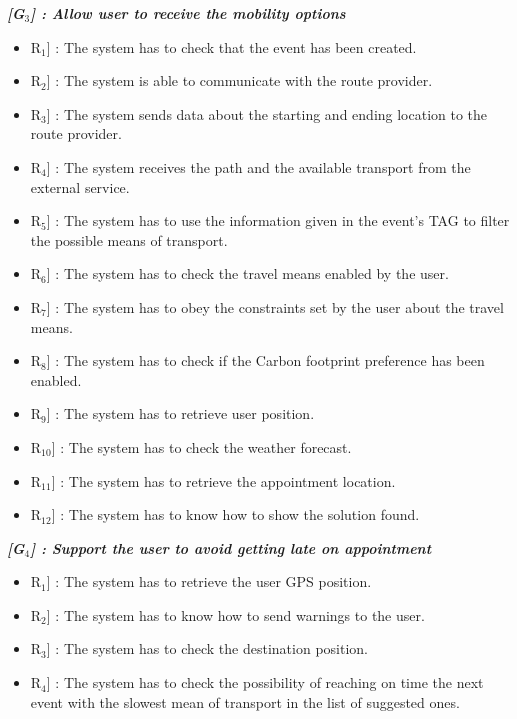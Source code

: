 \vspace{0.5cm}
\noindent
\emph{\textbf{[G$_{3}$] : Allow user to receive the mobility options}}
\begin{itemize}
	\setlength{\leftskip}{0.5cm}
	\item \lbrack R$_{1}$] : The system has to check that the event has been created.
	\item \lbrack R$_{2}$] : The system is able to communicate with the route provider.
	\item \lbrack R$_{3}$] : The system sends data about the starting and ending location to the route provider.
	\item \lbrack R$_{4}$] : The system receives the path and the available transport from the external service.
	\item \lbrack R$_{5}$] : The system has to use the information given in the event’s TAG to filter the possible means of transport.
	\item \lbrack R$_{6}$] : The system has to check the travel means enabled by the user.
	\item \lbrack R$_{7}$] : The system has to obey the constraints set by the user about the travel means.
	\item \lbrack R$_{8}$] : The system has to check if the Carbon footprint preference has been enabled.
	\item \lbrack R$_{9}$] : The system has to retrieve user position.
	\item \lbrack R$_{10}$] : The system has to check the weather forecast.
	\item \lbrack R$_{11}$] : The system has to retrieve the appointment location.
	\item \lbrack R$_{12}$] : The system has to know how to show the solution found.
\end{itemize}

\vspace{0.5cm}
\noindent
\emph{\textbf{[G$_{4}$] : Support the user to avoid getting late on appointment}}
\begin{itemize}
	\setlength{\leftskip}{0.5cm}
	\item \lbrack R$_{1}$] : The system has to retrieve the user GPS position.
	\item \lbrack R$_{2}$] : The system has to know how to send warnings to the user.
	\item \lbrack R$_{3}$] : The system has to check the destination position.
	\item \lbrack R$_{4}$] : The system has to check the possibility of reaching on time the next event with the slowest mean of transport in the list of suggested ones.
\end{itemize}


